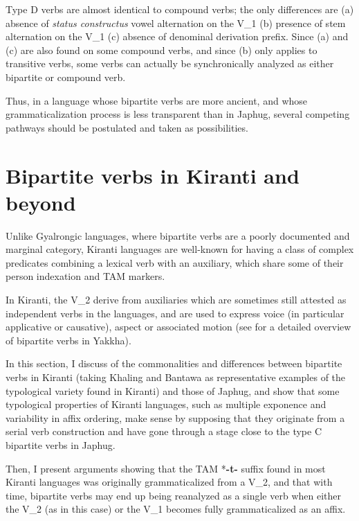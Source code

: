 \documentclass[11pt]{article}
\newcommand{\ipa}[1]{{\phon\textbf{#1}}}
\begin{document}
Type D verbs are almost identical to compound verbs; the only differences are (a)  absence of \textit{status constructus} vowel alternation on the V_1 (b) presence of stem alternation on the V_1 (c) absence of denominal derivation prefix. Since (a) and (c) are also found on some compound verbs, and since (b) only applies to transitive verbs, some verbs can actually be synchronically analyzed as either bipartite or compound verb.

Thus, in a language whose bipartite verbs are more ancient, and whose grammaticalization process is less transparent than in Japhug, several competing pathways should be postulated and taken as possibilities.

\section{Bipartite verbs in Kiranti and beyond} \label{sec:kiranti.bipart}
Unlike Gyalrongic languages, where bipartite verbs are a poorly documented and marginal category, Kiranti languages are well-known for having a class of complex predicates combining a lexical verb with an auxiliary, which share some of their person indexation and TAM markers. 

In Kiranti, the V_2 derive from auxiliaries which are sometimes still attested as independent verbs in the languages, and are used to express voice (in particular applicative or causative), aspect or associated motion (see \citealt[283-328]{schackow15yakkha} for a detailed overview of bipartite verbs in Yakkha).

In this section, I discuss of the commonalities and differences between bipartite verbs in Kiranti (taking Khaling and Bantawa as representative examples of the typological variety found in Kiranti) and those of Japhug, and show that some typological properties of Kiranti languages, such as multiple exponence and variability in affix ordering, make sense by supposing that they originate from a serial verb construction and have gone through a stage close to the type C bipartite verbs in Japhug.

 Then, I present arguments showing that the TAM *\ipa{-t-} suffix found in most Kiranti languages was originally grammaticalized from a V_2, and that with time, bipartite verbs may end up being reanalyzed as a single verb when either the V_2 (as in this case) or the V_1 becomes fully grammaticalized as an affix.
\end{document}
